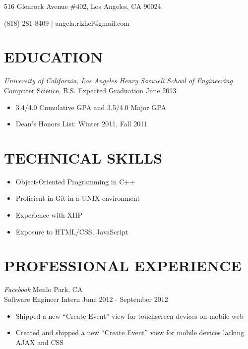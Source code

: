 \documentclass{res}
\begin{document}
\thispagestyle{empty} %

\begin{resume}
\centerline{516 Glenrock Avenue \#402, Los Angeles, CA 90024}
\centerline{(818) 281-8409 | angela.rizhel@gmail.com }

\section{EDUCATION}
\vspace{8pt}
{\sl University of California, Los Angeles \hfill Henry Samueli School of Engineering} \\
Computer Science, B.S. \hfill Expected Graduation June 2013

\vspace{8pt}
\begin{itemize} \itemsep -2pt %
  \item 3.4/4.0 Cumulative GPA and 3.5/4.0 Major GPA
  \item Dean's Honors List: Winter 2011, Fall 2011
\end{itemize} \vspace{-6pt}

\section{TECHNICAL SKILLS}
\vspace{0.25in}
  \begin{itemize}  \itemsep -2pt
    \item Object-Oriented Programming in C++
    \item Proficient in Git in a UNIX environment
    \item Experience with XHP
    \item Exposure to HTML/CSS, JavaScript
  \end{itemize}

\section{PROFESSIONAL EXPERIENCE}
\vspace{8pt}
  {\sl Facebook} \hfill Menlo Park, CA \\
  Software Engineer Intern \hfill June 2012 - September 2012

   \begin{itemize} \itemsep -2pt %
     \item Shipped a new ``Create Event'' view for touchscreen devices on mobile web
     \item Created and shipped a new ``Create Event'' view for mobile devices lacking AJAX and CSS
   \end{itemize} \vspace{-6pt}


\end{resume}
\end{document}
